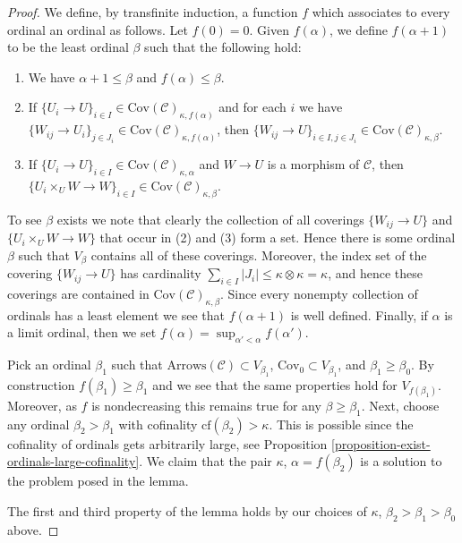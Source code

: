 \begin{proof}
\medskip\noindent
We define, by transfinite induction, a function $f$ which associates
to every ordinal an ordinal as follows. Let $f(0) = 0$.
Given $f(\alpha)$, we define $f(\alpha + 1)$ to be the least
ordinal $\beta$ such that the following hold:
\begin{enumerate}
\item We have $\alpha + 1 \leq \beta$ and $f(\alpha) \leq \beta$.
\item If $\{U_i \to U\}_{i\in I}
\in \text{Cov}(\mathcal{C})_{\kappa, f(\alpha)}$
and for each $i$ we have
$\{W_{ij} \to U_i\}_{j\in J_i}
\in \text{Cov}(\mathcal{C})_{\kappa, f(\alpha)}$,
then
$\{W_{ij} \to U\}_{i \in I, j\in J_i}
\in \text{Cov}(\mathcal{C})_{\kappa, \beta}$.
\item If $\{U_i \to U\}_{i\in I}
\in \text{Cov}(\mathcal{C})_{\kappa, \alpha}$
and $W \to U$ is a morphism of $\mathcal{C}$, then
$\{U_i \times_U W \to W \}_{i\in I}
\in \text{Cov}(\mathcal{C})_{\kappa, \beta}$.
\end{enumerate}
To see $\beta$ exists we note that clearly the collection of all
coverings $\{W_{ij} \to U\}$ and $\{U_i \times_U W \to W \}$ that occur in
(2) and (3) form a set. Hence there is some ordinal $\beta$ such that
$V_\beta$ contains all of these coverings. Moreover, the index set
of the covering $\{W_{ij} \to U\}$ has cardinality
$\sum_{i \in I} |J_i| \leq \kappa \otimes \kappa = \kappa$, and
hence these coverings are contained in
$\text{Cov}(\mathcal{C})_{\kappa, \beta}$.
Since every nonempty collection of ordinals has a least element
we see that $f(\alpha + 1)$ is well defined. Finally, if $\alpha$
is a limit ordinal, then we set
$f(\alpha) = \sup_{\alpha' < \alpha} f(\alpha')$.

\medskip\noindent
Pick an ordinal $\beta_1$ such that
$\text{Arrows}(\mathcal{C}) \subset V_{\beta_1}$,
$\text{Cov}_0 \subset V_{\beta_1}$,
and $\beta_1 \geq \beta_0$.
By construction $f(\beta_1) \geq \beta_1$ and we see that
the same properties hold for $V_{f(\beta_1)}$. Moreover, as $f$ is
nondecreasing this remains true for any $\beta \geq \beta_1$.
Next, choose any ordinal $\beta_2 > \beta_1$ with
cofinality $\text{cf}(\beta_2) > \kappa$. This is possible
since the cofinality of ordinals gets arbitrarily large, see
Proposition \ref{proposition-exist-ordinals-large-cofinality}.
We claim that the pair $\kappa$,
$\alpha = f(\beta_2)$ is a solution to the problem posed in the lemma.

\medskip\noindent
The first and third property of the lemma holds by our choices
of $\kappa$, $\beta_2 > \beta_1 > \beta_0$ above.


\end{proof}
